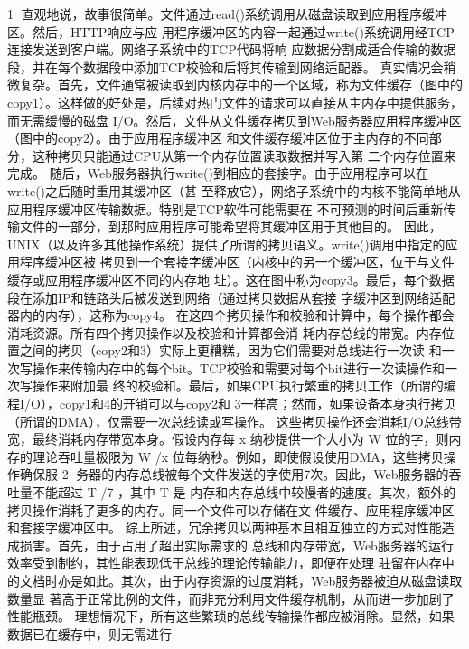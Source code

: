                                                 1
直观地说，故事很简单。文件通过read()系统调用从磁盘读取到应用程序缓冲区。然后，HTTP响应与应
用程序缓冲区的内容一起通过write()系统调用经TCP连接发送到客户端。网络子系统中的TCP代码将响
应数据分割成适合传输的数据段，并在每个数据段中添加TCP校验和后将其传输到网络适配器。
真实情况会稍微复杂。首先，文件通常被读取到内核内存中的一个区域，称为文件缓存（图中的
copy1）。这样做的好处是，后续对热门文件的请求可以直接从主内存中提供服务，而无需缓慢的磁盘
I/O。然后，文件从文件缓存拷贝到Web服务器应用程序缓冲区（图中的copy2）。由于应用程序缓冲区
和文件缓存缓冲区位于主内存的不同部分，这种拷贝只能通过CPU从第一个内存位置读取数据并写入第
二个内存位置来完成。
随后，Web服务器执行write()到相应的套接字。由于应用程序可以在write()之后随时重用其缓冲区（甚
至释放它），网络子系统中的内核不能简单地从应用程序缓冲区传输数据。特别是TCP软件可能需要在
不可预测的时间后重新传输文件的一部分，到那时应用程序可能希望将其缓冲区用于其他目的。
因此，UNIX（以及许多其他操作系统）提供了所谓的拷贝语义。write()调用中指定的应用程序缓冲区被
拷贝到一个套接字缓冲区（内核中的另一个缓冲区，位于与文件缓存或应用程序缓冲区不同的内存地
址）。这在图中称为copy3。最后，每个数据段在添加IP和链路头后被发送到网络（通过拷贝数据从套接
字缓冲区到网络适配器内的内存），这称为copy4。
在这四个拷贝操作和校验和计算中，每个操作都会消耗资源。所有四个拷贝操作以及校验和计算都会消
耗内存总线的带宽。内存位置之间的拷贝（copy2和3）实际上更糟糕，因为它们需要对总线进行一次读
和一次写操作来传输内存中的每个bit。TCP校验和需要对每个bit进行一次读操作和一次写操作来附加最
终的校验和。最后，如果CPU执行繁重的拷贝工作（所谓的编程I/O），copy1和4的开销可以与copy2和
3一样高；然而，如果设备本身执行拷贝（所谓的DMA），仅需要一次总线读或写操作。
这些拷贝操作还会消耗I/O总线带宽，最终消耗内存带宽本身。假设内存每 x 纳秒提供一个大小为 W
位的字，则内存的理论吞吐量极限为 W /x 位每纳秒。例如，即使假设使用DMA，这些拷贝操作确保服
                                                     2
务器的内存总线被每个文件发送的字使用7次。因此，Web服务器的吞吐量不能超过 T /7 ，其中 T 是
内存和内存总线中较慢者的速度。其次，额外的拷贝操作消耗了更多的内存。同一个文件可以存储在文
件缓存、应用程序缓冲区和套接字缓冲区中。
综上所述，冗余拷贝以两种基本且相互独立的方式对性能造成损害。首先，由于占用了超出实际需求的
总线和内存带宽，Web服务器的运行效率受到制约，其性能表现低于总线的理论传输能力，即便在处理
驻留在内存中的文档时亦是如此。其次，由于内存资源的过度消耗，Web服务器被迫从磁盘读取数量显
著高于正常比例的文件，而非充分利用文件缓存机制，从而进一步加剧了性能瓶颈。
理想情况下，所有这些繁琐的总线传输操作都应被消除。显然，如果数据已在缓存中，则无需进行
